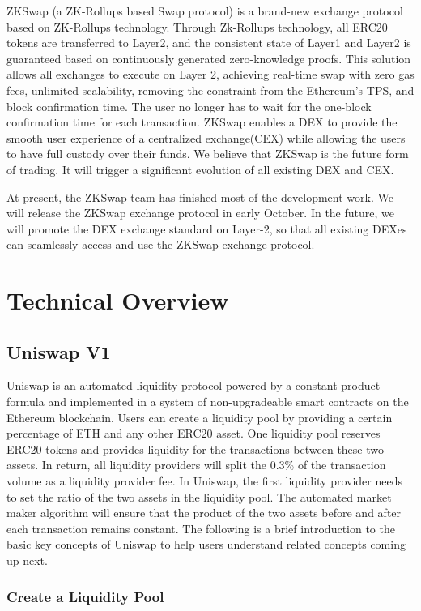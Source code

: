 \documentclass[]{template/llncs}
\begin{document}
ZKSwap (a ZK-Rollups based Swap protocol) is a brand-new exchange protocol based on ZK-Rollups technology. Through Zk-Rollups technology, all ERC20 tokens are transferred to Layer2, and the consistent state of Layer1 and Layer2 is guaranteed based on continuously generated zero-knowledge proofs. This solution allows all exchanges to execute on Layer 2, achieving real-time swap with zero gas fees, unlimited scalability, removing the constraint from the Ethereum's TPS, and block confirmation time. The user no longer has to wait for the one-block confirmation time for each transaction. ZKSwap enables a DEX to provide the smooth user experience of a centralized exchange(CEX) while allowing the users to have full custody over their funds. We believe that ZKSwap is the future form of trading. It will trigger a significant evolution of all existing DEX and CEX.

At present, the ZKSwap team has finished most of the development work. We will release the ZKSwap exchange protocol in early October. In the future, we will promote the DEX exchange standard on Layer-2, so that all existing DEXes can seamlessly access and use the ZKSwap exchange protocol.


\section{Technical Overview
}

\subsection{Uniswap V1}
Uniswap\cite{uniswapv1} is an automated liquidity protocol powered by a constant product formula and implemented in a system of non-upgradeable smart contracts on the Ethereum blockchain. Users can create a liquidity pool by providing a certain percentage of ETH and any other ERC20 asset. One liquidity pool reserves ERC20 tokens and provides liquidity for the transactions between these two assets. In return, all liquidity providers will split the 0.3\% of the transaction volume as a liquidity provider fee. In Uniswap, the first liquidity provider needs to set the ratio of the two assets in the liquidity pool. The automated market maker algorithm will ensure that the product of the two assets before and after each transaction remains constant. The following is a brief introduction to the basic key concepts of Uniswap to help users understand related concepts coming up next.


\subsubsection{Create a Liquidity Pool}
\end{document}
